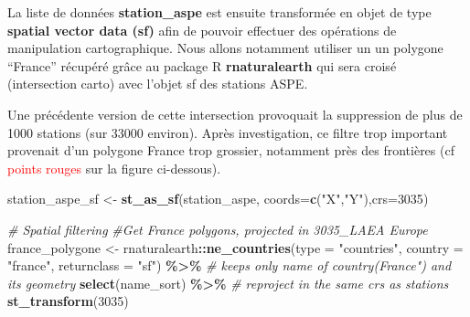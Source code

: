 \documentclass[]{template/RapportPole}
\newenvironment{Shaded}{\begin{snugshade}}{\end{snugshade}}
\newcommand{\AttributeTok}[1]{\textcolor[rgb]{0.13,0.29,0.53}{#1}}
\newcommand{\CommentTok}[1]{\textcolor[rgb]{0.56,0.35,0.01}{\textit{#1}}}
\newcommand{\DecValTok}[1]{\textcolor[rgb]{0.00,0.00,0.81}{#1}}
\newcommand{\FunctionTok}[1]{\textcolor[rgb]{0.13,0.29,0.53}{\textbf{#1}}}
\newcommand{\NormalTok}[1]{#1}
\newcommand{\OtherTok}[1]{\textcolor[rgb]{0.56,0.35,0.01}{#1}}
\newcommand{\SpecialCharTok}[1]{\textcolor[rgb]{0.81,0.36,0.00}{\textbf{#1}}}
\newcommand{\StringTok}[1]{\textcolor[rgb]{0.31,0.60,0.02}{#1}}
\begin{document}
La liste de données \textbf{station\_aspe} est ensuite transformée en objet de type \textbf{spatial vector data (sf)} afin de pouvoir effectuer des opérations de manipulation cartographique. Nous allons notamment utiliser un un polygone ``France'' récupéré grâce au package R \textbf{rnaturalearth} qui sera croisé (intersection carto) avec l'objet sf des stations ASPE.

\newpage

Une précédente version de cette intersection provoquait la suppression de plus de 1000 stations (sur 33000 environ). Après investigation, ce filtre trop important provenait d'un polygone France trop grossier, notamment près des frontières (cf \textcolor{red}{points rouges} sur la figure ci-dessous).

\begin{Shaded}
\begin{Highlighting}[]
\NormalTok{station\_aspe\_sf }\OtherTok{\textless{}{-}} \FunctionTok{st\_as\_sf}\NormalTok{(station\_aspe, }\AttributeTok{coords=}\FunctionTok{c}\NormalTok{(}\StringTok{"X"}\NormalTok{,}\StringTok{"Y"}\NormalTok{),}\AttributeTok{crs=}\DecValTok{3035}\NormalTok{) }

\CommentTok{\# Spatial filtering}
\CommentTok{\#Get France polygons, projected in 3035\_LAEA Europe}
\NormalTok{france\_polygone }\OtherTok{\textless{}{-}}\NormalTok{ rnaturalearth}\SpecialCharTok{::}\FunctionTok{ne\_countries}\NormalTok{(}\AttributeTok{type =} \StringTok{"countries"}\NormalTok{, }
                \AttributeTok{country =} \StringTok{"france"}\NormalTok{, }
                \AttributeTok{returnclass =} \StringTok{"sf"}\NormalTok{) }\SpecialCharTok{\%\textgreater{}\%} 
  \CommentTok{\# keeps only name of country(\textquotesingle{}France") and its geometry}
        \FunctionTok{select}\NormalTok{(name\_sort) }\SpecialCharTok{\%\textgreater{}\%} 
  \CommentTok{\# reproject in the same crs as stations}
        \FunctionTok{st\_transform}\NormalTok{(}\DecValTok{3035}\NormalTok{) }


\end{Highlighting}
\end{Shaded}
\end{document}
